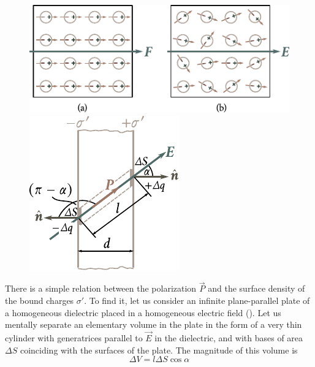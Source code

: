 \begin{figure}[t]
	\begin{minipage}[t]{0.64\linewidth}
		\begin{center}
			\includegraphics[scale=1]{figures/ch_02/fig_2_1.pdf}
			\caption[]{}
			\label{fig:2_1}
		\end{center}
	\end{minipage}
	\hfill{}%
	\begin{minipage}[t]{0.34\linewidth}
		\begin{center}
			\includegraphics[scale=1]{figures/ch_02/fig_2_2.pdf}
			\caption[]{}
			\label{fig:2_2}
		\end{center}
	\end{minipage}
\vspace{-0.4cm}
\end{figure}

There is a simple relation between the polarization $\vec{P}$ and the surface density of the bound charges $\sigma'$. To find it, let us consider an infinite plane-parallel plate of a homogeneous dielectric placed in a homogeneous electric field (). Let us mentally separate an elementary volume in the plate in the form of a very thin cylinder with generatrices parallel to $\vec{E}$ in the dielectric, and with bases of area $\Delta{S}$ coinciding with the surfaces of the plate. The magnitude of this volume is
\begin{equation*}
    \Delta{V} = l \Delta{S} \cos\alpha
\end{equation*}

